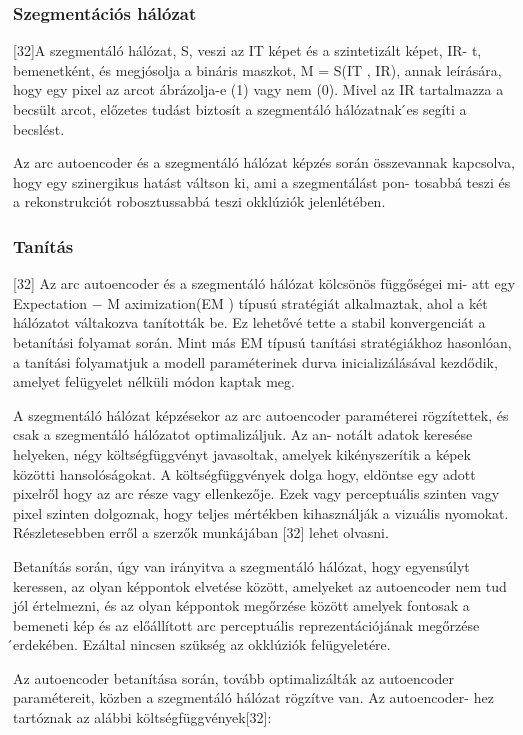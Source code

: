 \documentclass[12pt,a4]{article}
\begin{document}
 	\subsubsection{Szegmentációs hálózat}
 	[32]A szegmentáló hálózat, S, veszi az IT képet és a szintetizált képet, IR-
 	t, bemenetként, és megjósolja a bináris maszkot, M = S(IT , IR), annak
 	leírására, hogy egy pixel az arcot ábrázolja-e (1) vagy nem (0). Mivel az IR
 	tartalmazza a becsült arcot, előzetes tudást biztosít a szegmentáló hálózatnak
 	́es segíti a becslést.
 	
 	Az arc autoencoder és a szegmentáló hálózat képzés során összevannak
 	kapcsolva, hogy egy szinergikus hatást váltson ki, ami a szegmentálást pon-
 	tosabbá teszi és a rekonstrukciót robosztussabbá teszi okklúziók jelenlétében.
 	
 	\subsubsection{Tanítás}
 	[32] Az arc autoencoder és a szegmentáló hálózat kölcsönös függőségei mi-
 	att egy Expectation − M aximization(EM ) típusú stratégiát alkalmaztak,
 	ahol a két hálózatot váltakozva tanították be. Ez lehetővé tette a stabil
 	konvergenciát a betanítási folyamat során. Mint más EM típusú tanítási
 	stratégiákhoz hasonlóan, a tanítási folyamatjuk a modell paraméterinek
 	durva inicializálásával kezdődik, amelyet felügyelet nélküli módon kaptak
 	meg.
 	
 	A szegmentáló hálózat képzésekor az arc autoencoder paraméterei
 	rögzítettek, és csak a szegmentáló hálózatot optimalizáljuk. Az an-
 	notált adatok keresése helyeken, négy költségfüggvényt javasoltak, amelyek
 	kikényszerítik a képek közötti hansolóságokat. A költségfüggvények dolga
 	hogy, eldöntse egy adott pixelről hogy az arc része vagy ellenkezője. Ezek
 	vagy perceptuális szinten vagy pixel szinten dolgoznak, hogy teljes mértékben
 	kihasználják a vizuális nyomokat. Részletesebben erről a szerzők munkájában
 	[32] lehet olvasni.
 	
 	Betanítás során, úgy van irányitva a szegmentáló hálózat, hogy egyensúlyt
 	keressen, az olyan képpontok elvetése között, amelyeket az autoencoder nem
 	tud jól értelmezni, és az olyan képpontok megőrzése között amelyek fontosak
 	a bemeneti kép és az előállított arc perceptuális reprezentációjának megőrzése
 	́erdekében. Ezáltal nincsen szükség az okklúziók felügyeletére.
 	
 	Az autoencoder betanítása során, tovább optimalizálták az autoencoder
 	paramétereit, közben a szegmentáló hálózat rögzítve van. Az autoencoder-
 	hez tartóznak az alábbi költségfüggvények[32]:
 	
\end{document}
